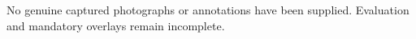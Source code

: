 No genuine captured photographs or annotations have been supplied. Evaluation and mandatory overlays remain incomplete.
